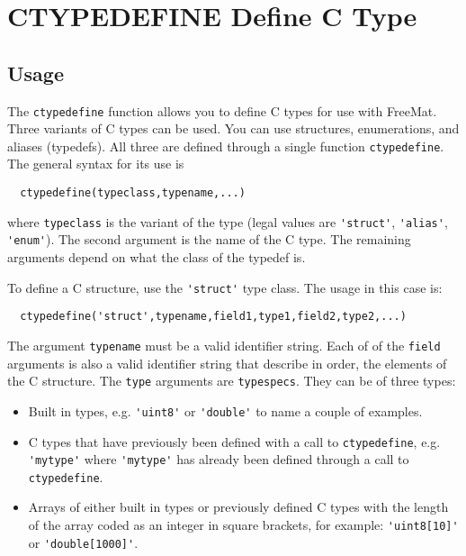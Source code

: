 \section{CTYPEDEFINE Define C Type}

\subsection{Usage}

The \verb|ctypedefine| function allows you to define C types for use
with FreeMat.  Three variants of C types can be used.  You can
use structures, enumerations, and aliases (typedefs).  All three are defined
through a single function \verb|ctypedefine|.  The general syntax for
its use is
\begin{verbatim}
  ctypedefine(typeclass,typename,...)
\end{verbatim}
where \verb|typeclass| is the variant of the type (legal values are
\verb|'struct'|, \verb|'alias'|, \verb|'enum'|).  The second argument is the
name of the C type.  The remaining arguments depend on what the
class of the typedef is.  

To define a C structure, use the \verb|'struct'| type class.  The usage
in this case is:
\begin{verbatim}
  ctypedefine('struct',typename,field1,type1,field2,type2,...)
\end{verbatim}
The argument \verb|typename| must be a valid identifier string.  Each of
of the \verb|field| arguments is also a valid identifier string that 
describe in order, the elements of the C structure.  The \verb|type| arguments
are \verb|typespecs|.  They can be of three types:
\begin{itemize}
\item  Built in types, e.g. \verb|'uint8'| or \verb|'double'| to name a couple of
      examples.

\item  C types that have previously been defined with a call to 
      \verb|ctypedefine|, e.g. \verb|'mytype'| where \verb|'mytype'| has already been
      defined through a call to \verb|ctypedefine|.

\item  Arrays of either built in types or previously defined C types
      with the length of the array coded as an integer in square brackets, 
      for example: \verb|'uint8[10]'| or \verb|'double[1000]'|.

\end{itemize}

